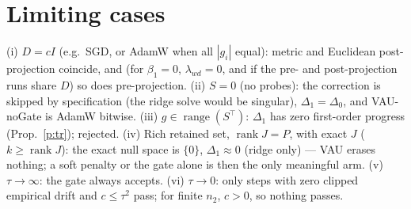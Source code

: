\documentclass[11pt]{article}
\theoremstyle{remark}
\begin{document}
\section{Limiting cases}
(i) $D=cI$ (e.g.\ SGD, or AdamW when all $|g_i|$ equal): metric and Euclidean post-projection coincide, and (for $\beta_1=0$, $\lambda_{wd}=0$, and if the pre- and post-projection runs share $D$) so does pre-projection. (ii) $S=0$ (no probes): the correction is skipped by specification (the ridge solve would be singular), $\Delta_1=\Delta_0$, and VAU-noGate is AdamW bitwise. (iii) $g\in\operatorname{range}(S^\top)$:
$\Delta_1$ has zero first-order progress (Prop.~\ref{p:tr}); rejected. (iv) Rich retained set, $\operatorname{rank}J=P$, with exact $J$ ($k\ge\operatorname{rank}J$): the
exact null space is $\{0\}$, $\Delta_1\approx0$ (ridge only) --- VAU erases nothing; a soft penalty or the gate alone is
then the only meaningful arm. (v) $\tau\to\infty$: the gate always accepts. (vi) $\tau\to0$: only steps with zero
clipped empirical drift and $c\le\tau^2$ pass; for finite $n_2$, $c>0$, so nothing passes.
\end{document}

